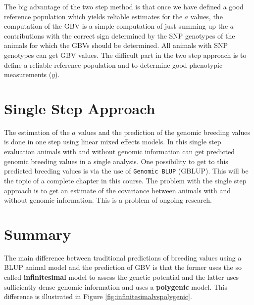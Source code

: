 \documentclass[]{book}
\theoremstyle{definition}
\theoremstyle{definition}
\theoremstyle{definition}
\theoremstyle{remark}
\begin{document}
The big advantage of the two step method is that once we have defined a good reference population which yields reliable estimates for the \(a\) values, the computation of the GBV is a simple computation of just summing up the \(a\) contributions with the correct sign determined by the SNP genotypes of the animals for which the GBVs should be determined. All animals with SNP genotypes can get GBV values. The difficult part in the two step approach is to define a reliable reference population and to determine good phenotypic measurements (\(y\)).

\hypertarget{asm-single-step-approach}{%
\section{Single Step Approach}\label{asm-single-step-approach}}

The estimation of the \(a\) values and the prediction of the genomic breeding values is done in one step using linear mixed effects models. In this single step evaluation animals with and without genomic information can get predicted genomic breeding values in a single analysis. One possibility to get to this predicted breeding values is via the use of \texttt{Genomic\ BLUP} (GBLUP). This will be the topic of a complete chapter in this course. The problem with the single step approach is to get an estimate of the covariance between animals with and without genomic information. This is a problem of ongoing research.

\hypertarget{asm-summary}{%
\section{Summary}\label{asm-summary}}

The main difference between traditional predictions of breeding values using a BLUP animal model and the prediction of GBV is that the former uses the so called \textbf{infinitesimal} model to assess the genetic potential and the latter uses sufficiently dense genomic information and uses a \textbf{polygenic} model. This difference is illustrated in Figure \ref{fig:infinitesimalvspolygenic}.
\end{document}
